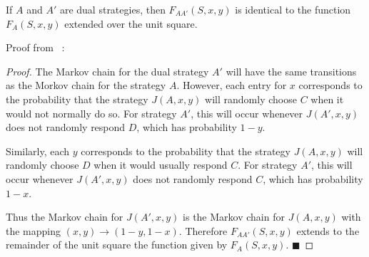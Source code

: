 \begin{theorem}\label{thm:fingerprint-unit-square}
If $A$ and $A'$ are dual strategies, then $F_{AA'}(S, x, y)$ is identical to the function $F_A(S, x, y)$ extended over the unit square.
\end{theorem}

Proof from ~\cite{Ashlock2004}:
\begin{proof}\label{prf:fingerprint-unit-square}
The Markov chain for the dual strategy $A'$ will have the same transitions as the Morkov chain for the strategy $A$.
However, each entry for $x$ corresponds to the probability that the strategy $J(A, x, y)$ will randomly choose $C$ when it would not normally do so.
For strategy $A'$, this will occur whenever $J(A', x, y)$ does not randomly respond $D$, which has probability $1 - y$.

Similarly, each $y$ corresponds to the probability that the strategy $J(A, x, y)$ will randomly choose $D$ when it would usually respond $C$.
For strategy $A'$, this will occur whenever $J(A', x, y)$ does not randomly respond $C$, which has probability $1 - x$.

Thus the Markov chain for $J(A', x, y)$ is the Markov chain for $J(A, x, y)$ with the mapping $(x, y) \rightarrow (1-y, 1-x)$.
Therefore $F_{AA'}(S, x, y)$ extends to the remainder of the unit square the function given by $F_A(S, x, y)$. $\blacksquare$
\end{proof}










